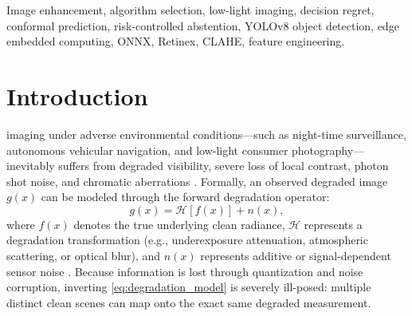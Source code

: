 \documentclass[journal]{IEEEtran}
\begin{document}
\begin{abstract}
bank, while an expanded 10-dimensional physical feature set confirms that the 8-D baseline is parsimonious and near-optimal ($d = -0.0184\text{ dB}$, $p = 0.5481$). Crucially, downstream vision evaluations confirm practical utility: on an end-to-end YOLOv8 object detection benchmark across unseen nocturnal scenes, our selector attains $67.15\%$ detection recall compared to only $48.53\%$ for the static Retinex baseline, which severely degrades detection due to noise-induced edge artifacts.
\end{abstract}

\begin{IEEEkeywords}
Image enhancement, algorithm selection, low-light imaging, decision regret, conformal prediction, risk-controlled abstention, YOLOv8 object detection, edge embedded computing, ONNX, Retinex, CLAHE, feature engineering.
\end{IEEEkeywords}

\section{Introduction}
 imaging under adverse environmental conditions—such as night-time surveillance, autonomous vehicular navigation, and low-light consumer photography—inevitably suffers from degraded visibility, severe loss of local contrast, photon shot noise, and chromatic aberrations \cite{zheng2024lowlight, wei2018deep}. Formally, an observed degraded image $g(x)$ can be modeled through the forward degradation operator:
\begin{equation}
g(x) = \mathcal{H}[f(x)] + n(x),
\label{eq:degradation_model}
\end{equation}
where $f(x)$ denotes the true underlying clean radiance, $\mathcal{H}$ represents a degradation transformation (e.g., underexposure attenuation, atmospheric scattering, or optical blur), and $n(x)$ represents additive or signal-dependent sensor noise \cite{chen2018learning}. Because information is lost through quantization and noise corruption, inverting \eqref{eq:degradation_model} is severely ill-posed: multiple distinct clean scenes can map onto the exact same degraded measurement.
\end{document}
